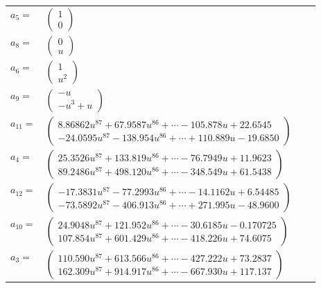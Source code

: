 \documentclass[1p]{elsarticle_modified}
\theoremstyle{definition}
\begin{document}
\begin{tabular}{m{7pt} m{180pt} m{7pt} m{180pt} }
\flushright $a_{5}=$&$\begin{pmatrix}1\\0\end{pmatrix}$ \\
\flushright $a_{8}=$&$\begin{pmatrix}0\\u\end{pmatrix}$ \\
\flushright $a_{6}=$&$\begin{pmatrix}1\\u^2\end{pmatrix}$ \\
\flushright $a_{9}=$&$\begin{pmatrix}- u\\- u^3+u\end{pmatrix}$ \\
\flushright $a_{11}=$&$\begin{pmatrix}8.86862 u^{87}+67.9587 u^{86}+\cdots-105.878 u+22.6545\\-24.0595 u^{87}-138.954 u^{86}+\cdots+110.889 u-19.6850\end{pmatrix}$ \\
\flushright $a_{4}=$&$\begin{pmatrix}25.3526 u^{87}+133.819 u^{86}+\cdots-76.7949 u+11.9623\\89.2486 u^{87}+498.120 u^{86}+\cdots-348.549 u+61.5438\end{pmatrix}$ \\
\flushright $a_{12}=$&$\begin{pmatrix}-17.3831 u^{87}-77.2993 u^{86}+\cdots-14.1162 u+6.54485\\-73.5892 u^{87}-406.913 u^{86}+\cdots+271.995 u-48.9600\end{pmatrix}$ \\
\flushright $a_{10}=$&$\begin{pmatrix}24.9048 u^{87}+121.952 u^{86}+\cdots-30.6185 u-0.170725\\107.854 u^{87}+601.429 u^{86}+\cdots-418.226 u+74.6075\end{pmatrix}$ \\
\flushright $a_{3}=$&$\begin{pmatrix}110.590 u^{87}+613.566 u^{86}+\cdots-427.222 u+73.2837\\162.309 u^{87}+914.917 u^{86}+\cdots-667.930 u+117.137\end{pmatrix}$ \\

\end{tabular}
\end{document}
